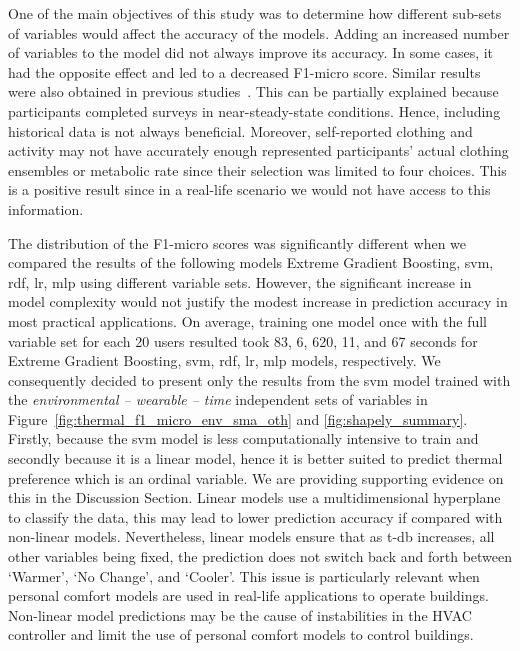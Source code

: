 One of the main objectives of this study was to determine how different sub-sets of variables would affect the accuracy of the models.
Adding an increased number of variables to the model did not always improve its accuracy.
In some cases, it had the opposite effect and led to a decreased F1-micro score.
Similar results were also obtained in previous studies~\cite{Liu2019a}.
This can be partially explained because participants completed surveys in near-steady-state conditions.
Hence, including historical data is not always beneficial.
Moreover, self-reported clothing and activity may not have accurately enough represented participants' actual clothing ensembles or metabolic rate since their selection was limited to four choices.
This is a positive result since in a real-life scenario we would not have access to this information.

The distribution of the F1-micro scores was significantly different when we compared the results of the following models Extreme Gradient Boosting, \ac{svm}, \gls{rdf}, \gls{lr}, \gls{mlp} using different variable sets.
However, the significant increase in model complexity would not justify the modest increase in prediction accuracy in most practical applications.
On average, training one model once with the full variable set for each 20 users resulted took 83, 6, 620, 11, and 67 seconds for Extreme Gradient Boosting, \ac{svm}, \gls{rdf}, \gls{lr}, \gls{mlp} models, respectively.
We consequently decided to present only the results from the \ac{svm} model trained with the \textit{environmental -- wearable -- time} independent sets of variables in Figure~\ref{fig:thermal_f1_micro_env_sma_oth} and \ref{fig:shapely_summary}.
Firstly, because the \ac{svm} model is less computationally intensive to train and secondly because it is a linear model, hence it is better suited to predict thermal preference which is an ordinal variable.
We are providing supporting evidence on this in the Discussion Section.
Linear models use a multidimensional hyperplane to classify the data, this may lead to lower prediction accuracy if compared with non-linear models.
Nevertheless, linear models ensure that as \ac{t-db} increases, all other variables being fixed, the prediction does not switch back and forth between `Warmer', `No Change', and `Cooler'.
This issue is particularly relevant when personal comfort models are used in real-life applications to operate buildings.
Non-linear model predictions may be the cause of instabilities in the HVAC controller and limit the use of personal comfort models to control buildings. 

